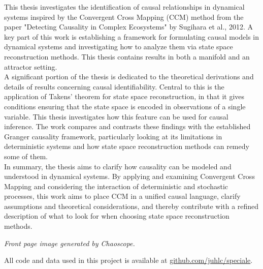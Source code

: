 \documentclass[11pt, a4paper]{memoir}
\subtitle{Convergent Cross Mapping and Alternative Approaches}
\renewenvironment{abstract}
  {\begin{oldabstract}\normalsize}  %
  {\end{oldabstract}}
\theoremstyle{break}
\theoremstyle{break}
\theoremstyle{nonumberplain}
\begin{document}
\begingroup
  \selectfont
  \maketitle
\endgroup
\frontmatter

\begin{abstract}
This thesis investigates the identification of causal relationships in dynamical systems inspired by the Convergent Cross Mapping (CCM) method from the paper "Detecting Causality in Complex Ecosystems" by Sugihara et al., 2012. A key part of this work is establishing a framework for formulating causal models in dynamical systems and investigating how to analyze them via state space reconstruction methods. This thesis contains results in both a manifold and an attractor setting.\\
A significant portion of the thesis is dedicated to the theoretical derivations and details of results concerning causal identifiability. Central to this is the application of Takens' theorem for state space reconstruction, in that it gives conditions ensuring that the state space is encoded in observations of a single variable. This thesis investigates how this feature can be used for causal inference. The work compares and contrasts these findings with the established Granger causality framework, particularly looking at its limitations in deterministic systems and how state space reconstruction methods can remedy some of them.\\
In summary, the thesis aims to clarify how causality can be modeled and understood in dynamical systems. By applying and examining Convergent Cross Mapping and considering the interaction of deterministic and stochastic processes, this work aims to place CCM in a unified causal language, clarify assumptions and theoretical considerations, and thereby contribute with a refined description of what to look for when choosing state space reconstruction methods.
\end{abstract}

\vfill
\textit{Front page image generated by Chaoscope.}
\newpage


\tableofcontents


\vfill
\noindent All code and data used in this project is available at \url{github.com/juhlc/speciale}.
\end{document}
